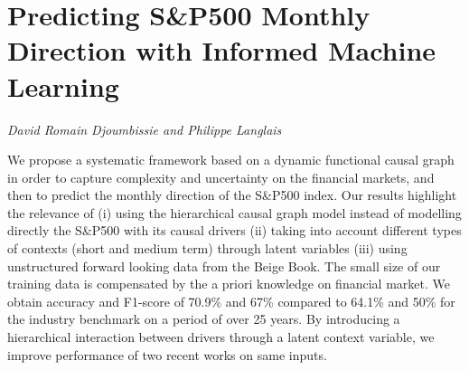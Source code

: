 \documentclass[../booklet.tex]{subfiles}
\begin{document}
\section[Predicting S\&P500 Monthly Direction with Informed Machine Learning. {\it David Romain Djoumbissie and Philippe Langlais}]{Predicting S\&P500 Monthly Direction with Informed Machine Learning}
 

\begin{center}
  {\it David Romain Djoumbissie and Philippe Langlais}
\end{center}

\vskip 0.8cm


We propose a systematic framework based on a dynamic functional causal graph in order to capture complexity and uncertainty on the financial markets, and then to predict the monthly direction of the S\&P500 index. Our results highlight the relevance of (i) using the hierarchical causal graph model instead of modelling directly the S\&P500 with its causal drivers (ii) taking into account different types of contexts (short and medium term) through latent variables (iii) using unstructured forward looking data from the Beige Book. The small size of our training data is compensated by the a priori knowledge on financial market. We obtain accuracy and F1-score of 70.9\% and 67\% compared to 64.1\% and 50\% for the industry benchmark on a period of over 25 years. By introducing a hierarchical interaction between drivers through a latent context variable, we improve performance of two recent works on same inputs.\\ 

\end{document}
